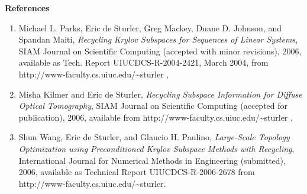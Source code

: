 \documentclass{report}
\begin{document}
\noindent
{\bf References}
\begin{enumerate}
\item
Michael L. Parks, Eric de Sturler, Greg Mackey, Duane D. Johnson, and Spandan Maiti,
{\em Recycling Krylov Subspaces for Sequences of Linear Systems}, SIAM
Journal on Scientific Computing (accepted with minor revisions), 2006,
available as Tech. Report
UIUCDCS-R-2004-2421, March 2004, from http://www-faculty.cs.uiuc.edu/\~{}sturler ,

\item
Misha Kilmer and Eric de Sturler,
{\em Recycling Subspace Information for Diffuse Optical Tomography},
SIAM Journal on Scientific Computing (accepted for publication),
2006, available from http://www-faculty.cs.uiuc.edu/\~{}sturler ,

\item
Shun Wang, Eric de Sturler, and Glaucio H. Paulino,
{\em Large-Scale Topology Optimization using Preconditioned Krylov
Subspace Methods with Recycling},
International Journal for Numerical Methods in Engineering (submitted), 2006,
available as Technical Report UIUCDCS-R-2006-2678
from http://www-faculty.cs.uiuc.edu/\~{}sturler.
\end{enumerate}
\end{document}
